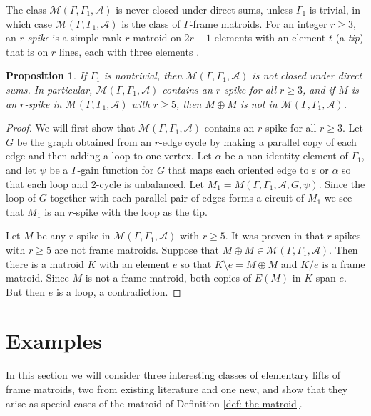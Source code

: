 \documentclass[12pt]{article}
\newtheorem{proposition}[theorem]{Proposition}
\theoremstyle{definition}
\newcommand{\cA}{\mathcal{A}}
\newcommand{\cM}{\mathcal{M}}
\newcommand{\ep}{\varepsilon}
\newcommand{\del}{\!\setminus\!}
\begin{document}
The class $\cM(\Gamma, \Gamma_1, \cA)$ is never closed under direct sums, unless $\Gamma_1$ is trivial, in which case $\cM(\Gamma, \Gamma_1, \cA)$ is the class of $\Gamma$-frame matroids.
For an integer $r \ge 3$, an \emph{$r$-spike} is a simple rank-$r$ matroid on $2r+1$ elements with an element $t$ (a \emph{tip}) that is on $r$ lines, each with three elements \cite[Proposition 1.5.18]{Oxley2011}.

\begin{proposition} \label{prop: direct sums}
If $\Gamma_1$ is nontrivial, then $\cM(\Gamma, \Gamma_1, \cA)$ is not closed under direct sums.
In particular, $\cM(\Gamma, \Gamma_1, \cA)$ contains an $r$-spike for all $r \ge 3$, and if $M$ is an $r$-spike in $\cM(\Gamma, \Gamma_1, \cA)$ with $r \ge 5$, then $M \oplus M$ is not in $\cM(\Gamma, \Gamma_1, \cA)$.
\end{proposition}
\begin{proof}
We will first show that $\cM(\Gamma, \Gamma_1, \cA)$ contains an $r$-spike for all $r \ge 3$.
Let $G$ be the graph obtained from an $r$-edge cycle by making a parallel copy of each edge and then adding a loop to one vertex.
Let $\alpha$ be a non-identity element of $\Gamma_1$, and let $\psi$ be a $\Gamma$-gain function for $G$ that maps each oriented edge to $\ep$ or $\alpha$ so that each loop and $2$-cycle is unbalanced.
Let $M_1 = M(\Gamma, \Gamma_1, \cA, G, \psi)$.
Since the loop of $G$ together with each parallel pair of edges forms a circuit of $M_1$ we see that $M_1$ is an $r$-spike with the loop as the tip.

Let $M$ be any $r$-spike in $\cM(\Gamma, \Gamma_1, \cA)$ with $r \ge 5$.
It was proven in \cite[page 35]{Geelen-Nelson-Walsh-2024} that $r$-spikes with $r \ge 5$ are not frame matroids.
Suppose that $M  \oplus M \in \cM(\Gamma, \Gamma_1, \cA)$.
Then there is a matroid $K$ with an element $e$ so that $K \del e = M \oplus M$ and $K/e$ is a frame matroid.
Since $M$ is not a frame matroid, both copies of $E(M)$ in $K$ span $e$.
But then $e$ is a loop, a contradiction.
\end{proof}










\section{Examples} \label{sec: examples}

In this section we will consider three interesting classes of elementary lifts of frame matroids, two from existing literature and one new, and show that they arise as special cases of the matroid of Definition \ref{def: the matroid}.
\end{document}
